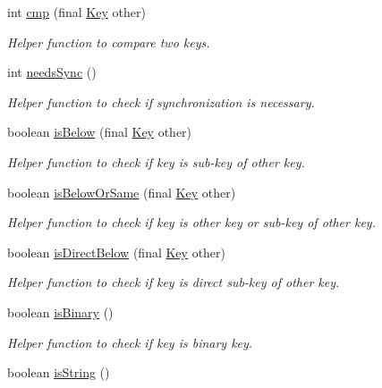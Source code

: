 \begin{DoxyCompactItemize}
int \hyperlink{classorg_1_1libelektra_1_1Key_aa5271913871c1ee2f31f32190a7e14aa}{cmp} (final \hyperlink{classorg_1_1libelektra_1_1Key}{Key} other)
\begin{DoxyCompactList}\small\item\em Helper function to compare two keys. \end{DoxyCompactList}\item 
int \hyperlink{classorg_1_1libelektra_1_1Key_a6f5afab907a28b264af0981e9db58c64}{needs\+Sync} ()
\begin{DoxyCompactList}\small\item\em Helper function to check if synchronization is necessary. \end{DoxyCompactList}\item 
boolean \hyperlink{classorg_1_1libelektra_1_1Key_af9a7a7941c07c058f1d4bd6c55e20fe9}{is\+Below} (final \hyperlink{classorg_1_1libelektra_1_1Key}{Key} other)
\begin{DoxyCompactList}\small\item\em Helper function to check if key is sub-\/key of other key. \end{DoxyCompactList}\item 
boolean \hyperlink{classorg_1_1libelektra_1_1Key_ab3143b14824a384ec4b6f9005f6da554}{is\+Below\+Or\+Same} (final \hyperlink{classorg_1_1libelektra_1_1Key}{Key} other)
\begin{DoxyCompactList}\small\item\em Helper function to check if key is other key or sub-\/key of other key. \end{DoxyCompactList}\item 
boolean \hyperlink{classorg_1_1libelektra_1_1Key_a799b0577d5e1491702e45566c943bda4}{is\+Direct\+Below} (final \hyperlink{classorg_1_1libelektra_1_1Key}{Key} other)
\begin{DoxyCompactList}\small\item\em Helper function to check if key is direct sub-\/key of other key. \end{DoxyCompactList}\item 
boolean \hyperlink{classorg_1_1libelektra_1_1Key_a2323fd06287eac6343ed60756f3cc9c1}{is\+Binary} ()
\begin{DoxyCompactList}\small\item\em Helper function to check if key is binary key. \end{DoxyCompactList}\item 
boolean \hyperlink{classorg_1_1libelektra_1_1Key_acb0e1141fa920b798a66a2076cd61562}{is\+String} ()

\end{DoxyCompactItemize}
